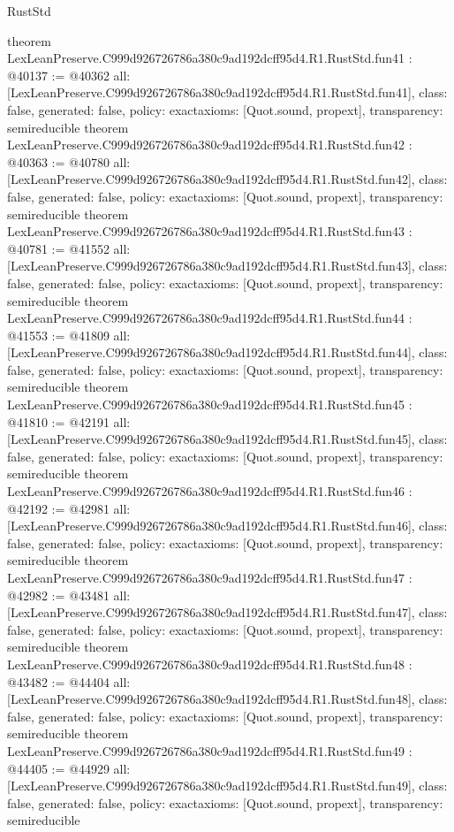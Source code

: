 \begin{lexlean}{RustStd}
\begin{coremodule}
{}
theorem LexLeanPreserve.C999d926726786a380c9ad192dcff95d4.R1.RustStd.fun41 : @40137 := @40362 {
  all: [LexLeanPreserve.C999d926726786a380c9ad192dcff95d4.R1.RustStd.fun41],
  class: false,
  generated: false,
  policy: exact{axioms: [Quot.sound, propext]},
  transparency: semireducible
}
theorem LexLeanPreserve.C999d926726786a380c9ad192dcff95d4.R1.RustStd.fun42 : @40363 := @40780 {
  all: [LexLeanPreserve.C999d926726786a380c9ad192dcff95d4.R1.RustStd.fun42],
  class: false,
  generated: false,
  policy: exact{axioms: [Quot.sound, propext]},
  transparency: semireducible
}
theorem LexLeanPreserve.C999d926726786a380c9ad192dcff95d4.R1.RustStd.fun43 : @40781 := @41552 {
  all: [LexLeanPreserve.C999d926726786a380c9ad192dcff95d4.R1.RustStd.fun43],
  class: false,
  generated: false,
  policy: exact{axioms: [Quot.sound, propext]},
  transparency: semireducible
}
theorem LexLeanPreserve.C999d926726786a380c9ad192dcff95d4.R1.RustStd.fun44 : @41553 := @41809 {
  all: [LexLeanPreserve.C999d926726786a380c9ad192dcff95d4.R1.RustStd.fun44],
  class: false,
  generated: false,
  policy: exact{axioms: [Quot.sound, propext]},
  transparency: semireducible
}
theorem LexLeanPreserve.C999d926726786a380c9ad192dcff95d4.R1.RustStd.fun45 : @41810 := @42191 {
  all: [LexLeanPreserve.C999d926726786a380c9ad192dcff95d4.R1.RustStd.fun45],
  class: false,
  generated: false,
  policy: exact{axioms: [Quot.sound, propext]},
  transparency: semireducible
}
theorem LexLeanPreserve.C999d926726786a380c9ad192dcff95d4.R1.RustStd.fun46 : @42192 := @42981 {
  all: [LexLeanPreserve.C999d926726786a380c9ad192dcff95d4.R1.RustStd.fun46],
  class: false,
  generated: false,
  policy: exact{axioms: [Quot.sound, propext]},
  transparency: semireducible
}
theorem LexLeanPreserve.C999d926726786a380c9ad192dcff95d4.R1.RustStd.fun47 : @42982 := @43481 {
  all: [LexLeanPreserve.C999d926726786a380c9ad192dcff95d4.R1.RustStd.fun47],
  class: false,
  generated: false,
  policy: exact{axioms: [Quot.sound, propext]},
  transparency: semireducible
}
theorem LexLeanPreserve.C999d926726786a380c9ad192dcff95d4.R1.RustStd.fun48 : @43482 := @44404 {
  all: [LexLeanPreserve.C999d926726786a380c9ad192dcff95d4.R1.RustStd.fun48],
  class: false,
  generated: false,
  policy: exact{axioms: [Quot.sound, propext]},
  transparency: semireducible
}
theorem LexLeanPreserve.C999d926726786a380c9ad192dcff95d4.R1.RustStd.fun49 : @44405 := @44929 {
  all: [LexLeanPreserve.C999d926726786a380c9ad192dcff95d4.R1.RustStd.fun49],
  class: false,
  generated: false,
  policy: exact{axioms: [Quot.sound, propext]},
  transparency: semireducible
}
\end{coremodule}
\end{lexlean}
